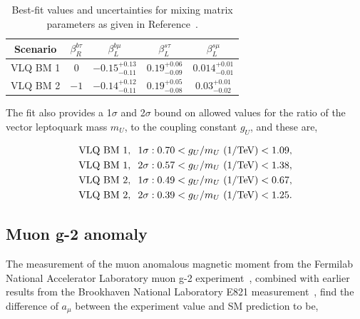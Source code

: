 \begin{table}[h]
\centering
\begin{tabular}{|c|c||c|c|c|}
\hline
Scenario & $\beta^{b\tau}_{R}$ & $\beta^{b\mu}_{L}$ & $\beta^{s\tau}_{L}$ & $\beta^{s\mu}_{L}$ \\
\hline
\hline
VLQ BM 1 & $0$ & $-0.15^{+0.13}_{-0.11}$ & $0.19^{+0.06}_{-0.09}$ & $0.014^{+0.01}_{-0.01}$ \\
VLQ BM 2 & $-1$ & $-0.14^{+0.12}_{-0.11}$ & $0.19^{+0.05}_{-0.08}$ & $0.03^{+0.01}_{-0.02}$ \\
\hline
\end{tabular}
\caption[Best-fit values for a vector leptoquark fit to the B anomalies.]{Best-fit values and uncertainties for mixing matrix parameters as given in Reference~\cite{Cornella:2021sby}.}
\label{tab:vlq_bestfit}
\end{table}

The fit also provides a 1$\sigma$ and 2$\sigma$ bound on allowed values for the ratio of the vector leptoquark mass $m_{U}$, to the coupling constant $g_{U}$, and these are,

\begin{align}
\begin{split}
\text{VLQ BM 1}, \hspace{0.2cm} 1\sigma&: 0.70 < g_{U}/m_{U} \text{ (1/TeV)} < 1.09, \\
\text{VLQ BM 1}, \hspace{0.2cm} 2\sigma&: 0.57 < g_{U}/m_{U} \text{ (1/TeV)} < 1.38, \\
\text{VLQ BM 2}, \hspace{0.2cm} 1\sigma&: 0.49 < g_{U}/m_{U} \text{ (1/TeV)} < 0.67, \\
\text{VLQ BM 2}, \hspace{0.2cm} 2\sigma&: 0.39 < g_{U}/m_{U} \text{ (1/TeV)} < 1.25.
\end{split}
\end{align}

\subsection{Muon g-2 anomaly}
\label{sec:gm2_anomaly}

The measurement of the muon anomalous magnetic moment from the Fermilab National Accelerator Laboratory muon g-2 experiment~\cite{Muong-2:2021ojo}, combined with earlier results from the Brookhaven National Laboratory E821 measurement~\cite{Muong-2:2006rrc}, find the difference of $a_\mu$ between the experiment value and \ac{SM} prediction to be,

